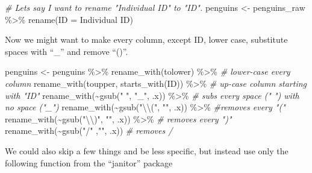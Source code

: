 \documentclass[
]{book}
\newenvironment{Shaded}{\begin{snugshade}}{\end{snugshade}}
\newcommand{\CommentTok}[1]{\textcolor[rgb]{0.56,0.35,0.01}{\textit{#1}}}
\newcommand{\FunctionTok}[1]{\textcolor[rgb]{0.00,0.00,0.00}{#1}}
\newcommand{\NormalTok}[1]{#1}
\newcommand{\OtherTok}[1]{\textcolor[rgb]{0.56,0.35,0.01}{#1}}
\newcommand{\SpecialCharTok}[1]{\textcolor[rgb]{0.00,0.00,0.00}{#1}}
\newcommand{\StringTok}[1]{\textcolor[rgb]{0.31,0.60,0.02}{#1}}
\begin{document}
\begin{Shaded}
\begin{Highlighting}[]
\CommentTok{\# Lets say I want to rename "Individual ID" to "ID".}
\NormalTok{penguins }\OtherTok{\textless{}{-}}\NormalTok{ penguins\_raw }\SpecialCharTok{\%\textgreater{}\%} 
  \FunctionTok{rename}\NormalTok{(}\StringTok{\textquotesingle{}ID\textquotesingle{}} \OtherTok{=} \StringTok{\textquotesingle{}Individual ID\textquotesingle{}}\NormalTok{)}
\end{Highlighting}
\end{Shaded}

Now we might want to make every column, except ID, lower case, substitute spaces with ``\_'' and remove ``()''.

\begin{Shaded}
\begin{Highlighting}[]
\NormalTok{penguins }\OtherTok{\textless{}{-}}\NormalTok{ penguins }\SpecialCharTok{\%\textgreater{}\%} 
  \FunctionTok{rename\_with}\NormalTok{(tolower) }\SpecialCharTok{\%\textgreater{}\%}  \CommentTok{\# lower{-}case every column}
  \FunctionTok{rename\_with}\NormalTok{(toupper, }\FunctionTok{starts\_with}\NormalTok{(}\StringTok{\textquotesingle{}ID\textquotesingle{}}\NormalTok{)) }\SpecialCharTok{\%\textgreater{}\%} \CommentTok{\# up{-}case column starting with "ID"}
  \FunctionTok{rename\_with}\NormalTok{(}\SpecialCharTok{\textasciitilde{}}\FunctionTok{gsub}\NormalTok{(}\StringTok{" "}\NormalTok{, }\StringTok{"\_"}\NormalTok{, .x))  }\SpecialCharTok{\%\textgreater{}\%} \CommentTok{\# subs every space (" ") with no space ("\_")}
  \FunctionTok{rename\_with}\NormalTok{(}\SpecialCharTok{\textasciitilde{}}\FunctionTok{gsub}\NormalTok{(}\StringTok{"}\SpecialCharTok{\textbackslash{}\textbackslash{}}\StringTok{("}\NormalTok{, }\StringTok{""}\NormalTok{, .x)) }\SpecialCharTok{\%\textgreater{}\%}  \CommentTok{\#removes every "("}
  \FunctionTok{rename\_with}\NormalTok{(}\SpecialCharTok{\textasciitilde{}}\FunctionTok{gsub}\NormalTok{(}\StringTok{"}\SpecialCharTok{\textbackslash{}\textbackslash{}}\StringTok{)"}\NormalTok{, }\StringTok{""}\NormalTok{, .x))  }\SpecialCharTok{\%\textgreater{}\%} \CommentTok{\# removes every ")"}
  \FunctionTok{rename\_with}\NormalTok{(}\SpecialCharTok{\textasciitilde{}}\FunctionTok{gsub}\NormalTok{(}\StringTok{"/"}\NormalTok{ ,}\StringTok{""}\NormalTok{, .x))  }\CommentTok{\# removes /}
\end{Highlighting}
\end{Shaded}

We could also skip a few things and be less specific, but instead use only the following function from the ``janitor'' package
\end{document}
